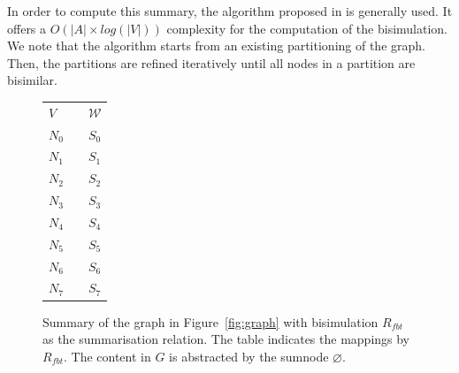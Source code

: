 In order to compute this summary, the algorithm proposed in \cite{Paige:1987:TPR:37185.37186} is generally used. It offers a $O\left( \vert A \vert \times log\left( \vert V \vert \right) \right)$ complexity for the computation of the bisimulation. We note that the algorithm starts from an existing partitioning of the graph. Then, the partitions are refined iteratively until all nodes in a partition are bisimilar.%

\begin{figure}
	\centering
	\begin{minipage}{.75\textwidth}
		\resizebox{\textwidth}{!}{
			
		}
	\end{minipage}
	\quad
	\begin{minipage}[h]{.2\textwidth}
		\centering
		\caption*{$R_{fbt}\left(V, \mathcal{W}\right)$}
		\begin{tabular}{lc@{\hs}l}
			\toprule
			$V$ & \phantom{a} & $\mathcal{W}$ \\
			\cmidrule{1-1} \cmidrule{3-3}
			$N_0$ & \phantom{a} & $S_0$ \\
			$N_1$ & \phantom{a} & $S_1$ \\
			$N_2$ & \phantom{a} & $S_2$ \\
			$N_3$ & \phantom{a} & $S_3$ \\
			$N_4$ & \phantom{a} & $S_4$ \\
			$N_5$ & \phantom{a} & $S_5$ \\
			$N_6$ & \phantom{a} & $S_6$ \\
			$N_7$ & \phantom{a} & $S_7$ \\
			\bottomrule
		\end{tabular}
	\end{minipage}
	\caption{Summary of the graph in Figure~\ref{fig:graph} with bisimulation $R_{fbt}$ as the summarisation relation. The table indicates the mappings by $R_{fbt}$. The content in $G$ is abstracted by the sumnode $\varnothing$.}
	\label{fig:fbb-summary}
\end{figure}


